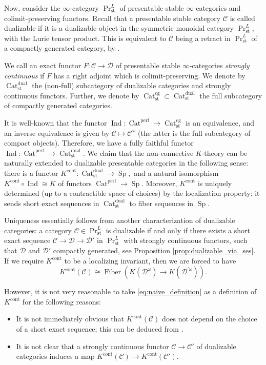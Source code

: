 \documentclass[11pt,leqno]{amsart}
\numberwithin{equation}{section}
\newcommand{\Cat}{\operatorname{Cat}}
\newcommand{\Fiber}{\operatorname{Fiber}}
\newcommand{\cont}{\operatorname{cont}}
\newcommand{\st}{\operatorname{st}}
\newcommand{\cg}{\operatorname{cg}}
\newcommand{\dual}{\operatorname{dual}}
\newcommand{\cD}{{\mathcal D}}
\newcommand{\cC}{{\mathcal C}}
\newcommand{\perf}{\operatorname{perf}}
\newcommand{\Sp}{\operatorname{Sp}}
\newcommand{\Ind}{\operatorname{Ind}}
\begin{document}
Now, consider the $\infty$-category $\Pr_{\st}^L$  of presentable stable $\infty$-categories and colimit-preserving functors. Recall that a presentable stable category $\cC$ is called dualizable if it is a dualizable object in the symmetric monoidal category $\Pr_{\st}^L,$ with the Lurie tensor product. This is equivalent to $\cC$ being a retract in $\Pr_{\st}^L$ of a compactly generated category, by \cite[Proposition D.7.3.1]{Lur18}.

We call an exact functor $F:\cC\to\cD$ of presentable stable $\infty$-categories {\it strongly continuous} if $F$ has a right adjoint which is colimit-preserving. We denote by $\Cat_{\st}^{\dual}$ the (non-full) subcategory of dualizable categories and strongly continuous functors. Further, we denote by $\Cat_{\st}^{\cg}\subset \Cat_{\st}^{\dual}$ the full subcategory of compactly generated categories.

It is well-known that the functor $\Ind:\Cat^{\perf}\to\Cat_{\st}^{\cg}$ is an equivalence, and an inverse equivalence is given by $\cC\mapsto\cC^{\omega}$ (the latter is the full subcategory of compact objects). Therefore, we have a fully faithful functor $\Ind:\Cat^{\perf}\to \Cat_{\st}^{\dual}.$ We claim that the non-connective $K$-theory can be naturally extended to dualizable presentable categories in the following sense: there is a functor $K^{\cont}:\Cat_{\st}^{\dual}\to \Sp,$ and a natural isomorphism $K^{\cont}\circ\Ind\cong K$ of functors $\Cat^{\perf}\to\Sp.$ Moreover, $K^{\cont}$ is uniquely determined (up to a contractible space of choices) by the localization property: it sends short exact sequences in $\Cat_{\st}^{\dual}$ to fiber sequences in $\Sp.$

Uniqueness essentially follows from another characterization of dualizable categories: a category $\cC\in\Pr_{\st}^L$ is dualizable if and only if there exists a short exact sequence $\cC\to\cD\to\cD'$ in $\Pr_{\st}^L$ with strongly continuous functors, such that $\cD$ and $\cD'$ compactly generated, see Proposition \ref{prop:dualizable_via_ses}. If we require $K^{\cont}$ to be a localizing invariant, then we are forced to have 
\begin{equation}\label{eq:naive_definition}K^{\cont}(\cC)\cong\Fiber(K(\cD^{\omega})\to K(\cD^{'\omega})).\end{equation} 

However, it is not very reasonable to take \eqref{eq:naive_definition} as a definition of $K^{\cont}$ for the following reasons:

\begin{itemize}
\item It is not immediately obvious that $K^{\cont}(\cC)$ does not depend on the choice of a short exact sequence; this can be deduced from \cite[Theorem 18]{Tam}. 

\item It is not clear that a strongly continuous functor $\cC\to\cC'$ of dualizable categories induces a map $K^{\cont}(\cC)\to K^{\cont}(\cC').$
\end{itemize}
\end{document}

